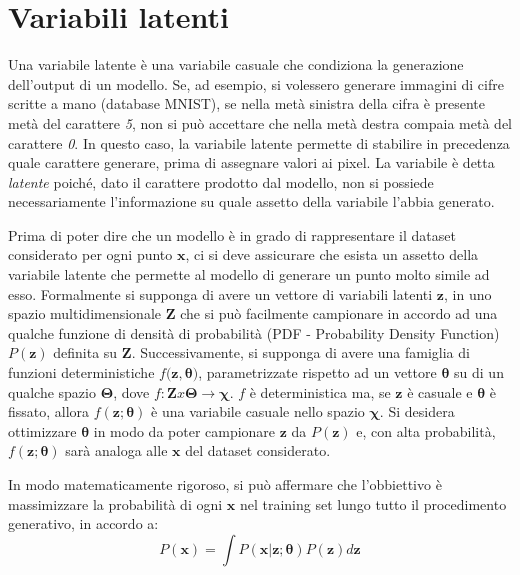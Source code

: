 \section{Variabili latenti} %
\label{sec:variabili_latenti}
Una variabile latente è una variabile casuale che condiziona la generazione dell'output di un modello. Se, ad esempio, si volessero generare immagini di cifre scritte a mano (database MNIST), se nella metà sinistra della cifra è presente metà del carattere \textit{5}, non si può accettare che nella metà destra compaia metà del carattere \textit{0}. In questo caso, la variabile latente permette di stabilire in precedenza quale carattere generare, prima di assegnare valori ai pixel. La variabile è detta \textit{latente} poiché, dato il carattere prodotto dal modello, non si possiede necessariamente l'informazione su quale assetto della variabile l'abbia generato. 

Prima di poter dire che un modello è in grado di rappresentare il dataset considerato per ogni punto $\boldsymbol{x}$, ci si deve assicurare che esista un assetto della variabile latente che permette al modello di generare un punto molto simile ad esso. Formalmente si supponga di avere un vettore di variabili latenti $\boldsymbol{z}$, in uno spazio multidimensionale $\boldsymbol{Z}$ che si può facilmente campionare in accordo ad una qualche funzione di densità di probabilità (PDF - Probability Density Function) $P(\boldsymbol{z})$ definita su $\boldsymbol{Z}$. Successivamente, si supponga di avere una famiglia di funzioni deterministiche $f(\boldsymbol{z}, \boldsymbol{\theta)}$, parametrizzate rispetto ad un vettore $\boldsymbol{\theta}$ su di un qualche spazio $\boldsymbol{\Theta}$, dove $f : \boldsymbol{Z} x \boldsymbol{\Theta} \rightarrow \boldsymbol{\chi}$. $f$ è deterministica ma, se $\boldsymbol{z}$ è casuale e $\boldsymbol{\theta}$ è fissato, allora $f(\boldsymbol{z}; \boldsymbol{\theta})$ è una variabile casuale nello spazio $\boldsymbol{\chi}$. Si desidera ottimizzare $\boldsymbol{\theta}$ in modo da poter campionare $\boldsymbol{z}$ da $P(\boldsymbol{z})$ e, con alta probabilità, $f(\boldsymbol{z}; \boldsymbol{\theta})$ sarà analoga alle $\boldsymbol{x}$ del dataset considerato.

In modo matematicamente rigoroso, si può affermare che l'obbiettivo è massimizzare la probabilità di ogni $\boldsymbol{x}$ nel training set lungo tutto il procedimento generativo, in accordo a:
\begin{equation}
	\label{probability}
	P(\boldsymbol{x}) = \int P(\boldsymbol{x} | \boldsymbol{z}; \boldsymbol{\theta}) P(\boldsymbol{z})d\boldsymbol{z}
\end{equation}

